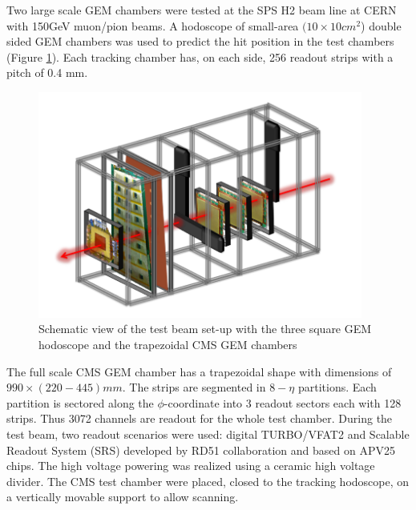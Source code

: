 Two large scale GEM chambers were tested at the SPS H2 beam line at CERN with 150GeV muon/pion beams. A hodoscope of small-area $(10\times 10 cm^2$) double sided GEM chambers was used to predict the hit position in the test chambers (Figure \ref{fig:tbsetup}). Each tracking chamber has, on each side, 256 readout strips with a pitch of 0.4 mm.

\begin{figure}[!htbp]
	\begin{center}
		\includegraphics[width=0.95\textwidth]{figures/GEM/tbsetup.png}
		\caption{Schematic view of the test beam set-up with the three square GEM hodoscope and the trapezoidal CMS GEM chambers}
		\label{fig:tbsetup}
	\end{center}
\end{figure} 

The full scale CMS GEM chamber has a trapezoidal shape with dimensions of $990\times (220-445)mm$. The strips are segmented in $8-\eta$ partitions. Each partition is sectored along the $\phi$-coordinate into 3 readout sectors each with 128 strips. Thus 3072 channels are readout for the whole test chamber. During the test beam, two readout scenarios were used: digital TURBO/VFAT2 and Scalable Readout System (SRS) developed by RD51 collaboration and based on APV25 chips. The high voltage powering was realized using a ceramic high voltage divider. The CMS test chamber were placed, closed to the tracking hodoscope, on a vertically movable support to allow scanning. 



